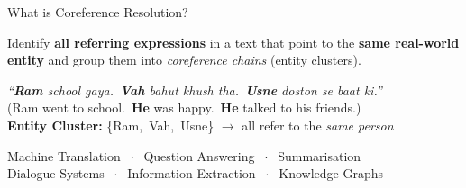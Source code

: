 \documentclass[aspectratio=169]{beamer}
\begin{document}
\begin{frame}{What is Coreference Resolution?}
  \begin{tcolorbox}[nbox={Task Definition}]
    Identify \textbf{all referring expressions} in a text that point to the
    \textbf{same real-world entity} and group them into
    \textit{coreference chains} (entity clusters).
  \end{tcolorbox}

  \vspace{6pt}
  \begin{tcolorbox}[rbox={Hindi Example}]
    \centering\small
    \textit{``\textbf{Ram} school gaya.\ \textcolor{accentorange}{\textbf{Vah}} bahut khush tha.\
    \textcolor{accentorange}{\textbf{Usne}} doston se baat ki.''}\\[4pt]
    (Ram went to school.\ \textcolor{accentorange}{\textbf{He}} was happy.\
    \textcolor{accentorange}{\textbf{He}} talked to his friends.)\\[5pt]
    \textbf{Entity Cluster:} \{Ram,\ Vah,\ Usne\}
    $\longrightarrow$ all refer to the \emph{same person}
  \end{tcolorbox}

  \vspace{6pt}
  \begin{tcolorbox}[gbox={Why It Matters — Downstream Applications}]
    \centering\small
    Machine Translation $\;\cdot\;$ Question Answering $\;\cdot\;$ Summarisation\\[2pt]
    Dialogue Systems $\;\cdot\;$ Information Extraction $\;\cdot\;$ Knowledge Graphs
  \end{tcolorbox}
\end{frame}
\end{document}
